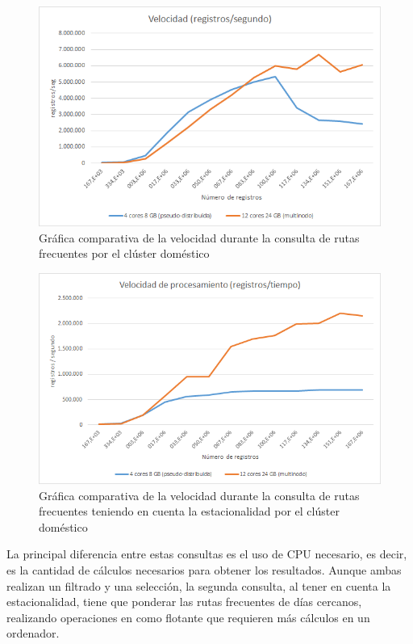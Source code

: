 \begin{figure}[htp!]
	\centering
	\caption{Gráfica comparativa de la velocidad durante la consulta de rutas frecuentes por el clúster doméstico}
	\label{gra:velFreqDom}
	\vspace{5pt}
	\includegraphics[scale=0.9]{graficas/vfdom}
\end{figure}
\begin{figure}[htp!]
	\centering
	\caption{Gráfica comparativa de la velocidad durante la consulta de rutas frecuentes teniendo en cuenta la estacionalidad por el clúster doméstico}
	\label{gra:velFreqDayDom}
	\vspace{5pt}
	\includegraphics[scale=0.9]{graficas/vfddom}
\end{figure}

La principal diferencia entre estas consultas es el uso de \gls{CPU} necesario, es decir, es la cantidad de cálculos necesarios para obtener los resultados. Aunque ambas realizan un filtrado y una selección, la segunda consulta, al tener en cuenta la estacionalidad, tiene que ponderar las rutas frecuentes de días cercanos, realizando operaciones en como flotante que requieren más cálculos en un ordenador.

